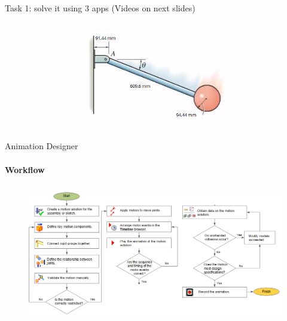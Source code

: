 \documentclass[aspectratio=169]{beamer}
\begin{document}
\begin{frame}[t]{Task 1: solve it using 3 apps (Videos on next slides)}
\begin{columns}[T,onlytextwidth]
\begin{column}{0.49\textwidth}
            \begin{figure}[H]
                \centering\includegraphics[height=4cm,width=1\textwidth,keepaspectratio]{task_1.png}
                \label{fig:task_1.png}
            \end{figure}
        \end{column}
    \end{columns}
\end{frame}

\begin{frame}[t]{Animation Designer}
\framesubtitle{Workflow}
    \vspace{-0.6cm}
    \begin{figure}[H]
        \centering\includegraphics[height=6cm,width=1\textwidth,keepaspectratio]{motion_designer_workflow3.png}
        \label{fig:motion_designer_workflow3.png}
    \end{figure}
\end{frame}
\end{document}
